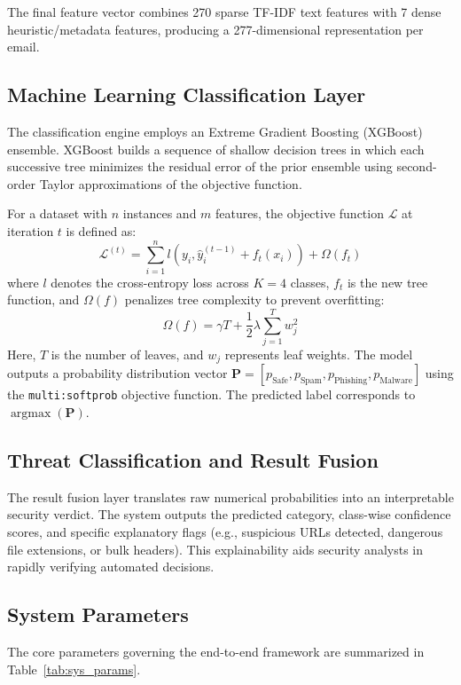 \documentclass[conference]{IEEEtran}
\begin{document}
The final feature vector combines 270 sparse TF-IDF text features with 7 dense heuristic/metadata features, producing a 277-dimensional representation per email.

\subsection{Machine Learning Classification Layer}
The classification engine employs an Extreme Gradient Boosting (XGBoost) ensemble. XGBoost builds a sequence of shallow decision trees in which each successive tree minimizes the residual error of the prior ensemble using second-order Taylor approximations of the objective function.

For a dataset with $n$ instances and $m$ features, the objective function $\mathcal{L}$ at iteration $t$ is defined as:
\begin{equation}
    \mathcal{L}^{(t)} = \sum_{i=1}^{n} l\left(y_i, \hat{y}_i^{(t-1)} + f_t(x_i)\right) + \Omega(f_t)
\end{equation}
where $l$ denotes the cross-entropy loss across $K=4$ classes, $f_t$ is the new tree function, and $\Omega(f)$ penalizes tree complexity to prevent overfitting:
\begin{equation}
    \Omega(f) = \gamma T + \frac{1}{2}\lambda\sum_{j=1}^{T} w_j^2
\end{equation}
Here, $T$ is the number of leaves, and $w_j$ represents leaf weights. The model outputs a probability distribution vector $\mathbf{P} = [p_{\text{Safe}}, p_{\text{Spam}}, p_{\text{Phishing}}, p_{\text{Malware}}]$ using the \texttt{multi:softprob} objective function. The predicted label corresponds to $\operatorname{argmax}(\mathbf{P})$.

\subsection{Threat Classification and Result Fusion}
The result fusion layer translates raw numerical probabilities into an interpretable security verdict. The system outputs the predicted category, class-wise confidence scores, and specific explanatory flags (e.g., suspicious URLs detected, dangerous file extensions, or bulk headers). This explainability aids security analysts in rapidly verifying automated decisions.

\subsection{System Parameters}
The core parameters governing the end-to-end framework are summarized in Table~\ref{tab:sys_params}.
\end{document}

